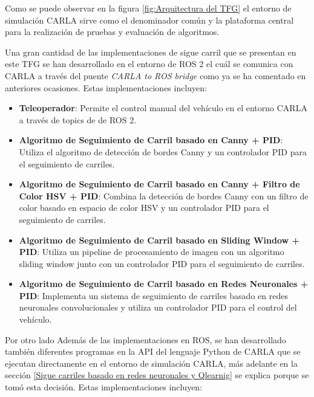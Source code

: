 Como se puede observar en la figura \ref{fig:Arquitectura del TFG} el entorno de simulación CARLA sirve como el denominador común y la plataforma central para la realización de pruebas y evaluación de algoritmos.

\bigskip

 Una gran cantidad de las implementaciones de sigue carril que se presentan en este \ac{TFG} se han desarrollado en el entorno de ROS 2 el cuál se comunica con CARLA a través del puente \textit{CARLA to ROS bridge} como ya se ha comentado en anteriores ocasiones. Estas implementaciones incluyen:

\bigskip

\begin{itemize}
  \item \textbf{Teleoperador}: Permite el control manual del vehículo en el entorno CARLA a través de topics de de ROS 2.

  \item \textbf{Algoritmo de Seguimiento de Carril basado en Canny + \ac{PID}}: Utiliza el algoritmo de detección de bordes Canny y un controlador \ac{PID} para el seguimiento de carriles.

  \item \textbf{Algoritmo de Seguimiento de Carril basado en Canny + Filtro de Color HSV + \ac{PID}}: Combina la detección de bordes Canny con un filtro de color basado en espacio de color HSV y un controlador \ac{PID} para el seguimiento de carriles.

  \item \textbf{Algoritmo de Seguimiento de Carril basado en Sliding Window + \ac{PID}}: Utiliza un pipeline de procesamiento de imagen con un algoritmo sliding window junto con un controlador \ac{PID} para el seguimiento de carriles.

  \item \textbf{Algoritmo de Seguimiento de Carril basado en Redes Neuronales + \ac{PID}}: Implementa un sistema de seguimiento de carriles basado en redes neuronales convolucionales y utiliza un controlador \ac{PID} para el control del vehículo.
\end{itemize}

\bigskip

Por otro lado Además de las implementaciones en ROS, se han desarrollado también diferentes programas en la \ac{API} del lenguaje Python de CARLA que se ejecutan directamente en el entorno de simulación CARLA, más adelante en la sección \ref{Sigue carriles basado en redes neuronales y Qlearnig} se explica porque se tomó esta decisión. Estas implementaciones incluyen:

